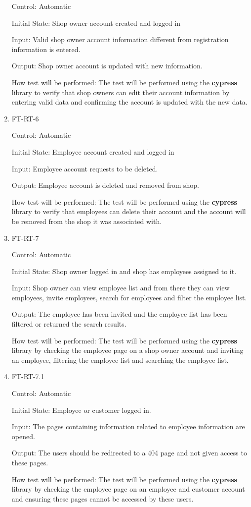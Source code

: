 \documentclass[12pt, titlepage]{article}
\begin{document}
\begin{enumerate}
Control: Automatic
					
Initial State: Shop owner account created and logged in
					
Input: Valid shop owner account information different from registration information is entered.
					
Output: Shop owner account is updated with new information.

How test will be performed: The test will be performed using the \textbf{cypress} library to verify that shop owners can edit their account information by entering valid data and confirming the account is updated with the new data.

\item{FT-RT-6\\}

Control: Automatic
					
Initial State: Employee account created and logged in
					
Input: Employee account requests to be deleted.
					
Output: Employee account is deleted and removed from shop.

How test will be performed: The test will be performed using the \textbf{cypress} library to verify that employees can delete their account and the account will be removed from the shop it was associated with.

\item{FT-RT-7\\}

Control: Automatic
					
Initial State: Shop owner logged in and shop has employees assigned to it.
					
Input: Shop owner can view employee list and from there they can view employees, invite employees, search for employees and filter the employee list.
					
Output: The  employee has been invited and the employee list has been filtered or returned the search results.

How test will be performed: The test will be performed using the \textbf{cypress} library by checking the employee page on a shop owner account and inviting an employee, filtering the employee list and searching the employee list.

\item{FT-RT-7.1\\}

Control: Automatic
					
Initial State: Employee or customer logged in.
					
Input: The pages containing information related to employee information are opened.
					
Output: The users should be redirected to a 404 page and not given access to these pages.

How test will be performed: The test will be performed using the \textbf{cypress} library by checking the employee page on an employee and customer account and ensuring these pages cannot be accessed by these users.

\end{enumerate}
\end{document}
